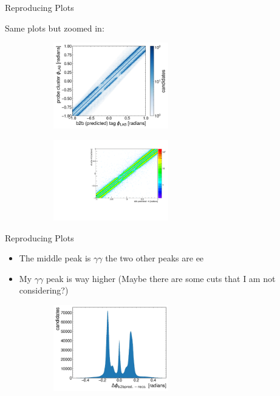 \documentclass[10pt]{beamer}
\begin{document}
{\begin{frame}{Reproducing Plots}
	
	Same plots but zoomed in:
	
		\begin{figure}
		\centering
		\begin{subfigure}{.5\textwidth}
			\centering
			\includegraphics[width=5cm]{Plots/ZommedSam.jpeg}
			
			\label{fig:sub1}
		\end{subfigure}%
		\begin{subfigure}{.5\textwidth}
			\centering
			\includegraphics[width=5cm]{Plots/zommedb2b}
			
			\label{fig:sub2}
		\end{subfigure}
		
		\label{fig:test}
	\end{figure}
		
\end{frame}


\begin{frame}{Reproducing Plots}
\begin{itemize} 
	\item The middle peak is $\gamma \gamma$ the two other peaks are $\textrm{ee}$
	\item My $\gamma \gamma$ peak is way higher (Maybe there are some cuts that I am not considering?)

\end{itemize}
\begin{figure}
	\centering
	\begin{subfigure}{.5\textwidth}
		\centering
		\includegraphics[width=5cm]{Plots/deltaPhiSam.jpeg}
	

\end{subfigure}
\end{figure}
\end{frame}}
\end{document}
